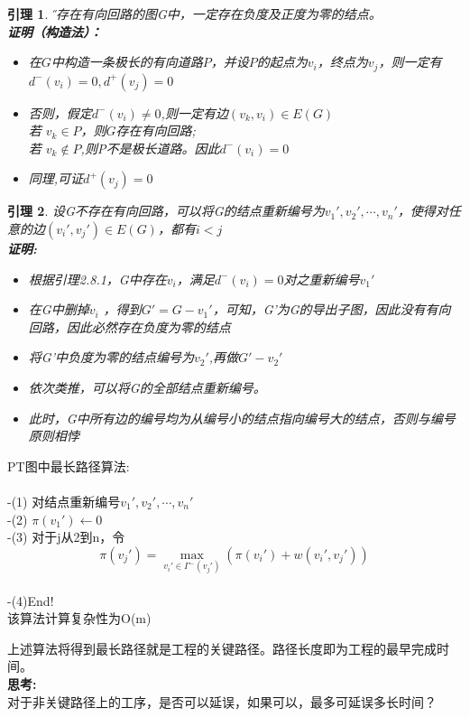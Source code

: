 \documentclass[11pt,a4paper,openany]{book}
\newtheorem{lemma}{\textbf{引理}}[section]
\begin{document}
\begin{lemma}\H
不存在有向回路的图G中，一定存在负度及正度为零的结点。\\
\textbf{证明（构造法）：}\\
\begin{itemize}
  \item[-] 在$G$中构造一条极长的有向道路$P$，并设$P$的起点为$v_i$，终点为$v_j$，则一定有$d^{-}(v_i)=0,d^{+}(v_j)=0$
  \item[-] 否则，假定$d^{-}(v_i)\neq 0$,则一定有边$(v_k,v_i)\in E(G)$\\
  若 $v_k\in P$，则$G$存在有向回路;\\
  若 $v_k \notin P$,则P不是极长道路。因此$d^{-}(v_i)=0$
  \item[-] 同理,可证$d^{+}(v_j)=0$
\end{itemize}
\end{lemma}
\begin{lemma}
设G不存在有向回路，可以将G的结点重新编号为$v_1',v_2',\cdots,v_n'$，使得对任意的边$(v_i',v_j')\in E(G)$，都有$i<j$\\
\textbf{证明:}\\
\begin{itemize}
  \item[-] 根据引理2.8.1，G中存在$v_i$，满足$d^{-}(v_i)=0$对之重新编号$v_1'$
  \item[-] 在G中删掉$v_i$ ，得到$G'=G-v_1'$，可知，G’为G的导出子图，因此没有有向回路，因此必然存在负度为零的结点
  \item[-] 将G'中负度为零的结点编号为$v_2'$,再做$G'-v_2'$
  \item[-] 依次类推，可以将G的全部结点重新编号。
  \item[-] 此时，G中所有边的编号均为从编号小的结点指向编号大的结点，否则与编号原则相悖
\end{itemize}
\end{lemma}
\begin{shaded}
PT图中最长路径算法:\\
\\
-(1) 对结点重新编号$v_1',v_2',\cdots,v_n'$\\
-(2) $\pi(v_1')\leftarrow 0$\\
-(3) 对于j从2到n，令$$\pi(v_j')=\mathop{max}\limits_{v_i'\in \Gamma^{-}(v_j')}(\pi(v_i')+w(v_i',v_j'))$$\\
-(4)End!\\
该算法计算复杂性为O(m)\\
\end{shaded}
\indent 上述算法将得到最长路径就是工程的关键路径。\textcolor[rgb]{1.00,0.00,0.00}{路径长度即为工程的最早完成时间}。\\
\textbf{思考:}\\
对于非关键路径上的工序，是否可以延误，如果可以，最多可延误多长时间？\\
\end{document}
